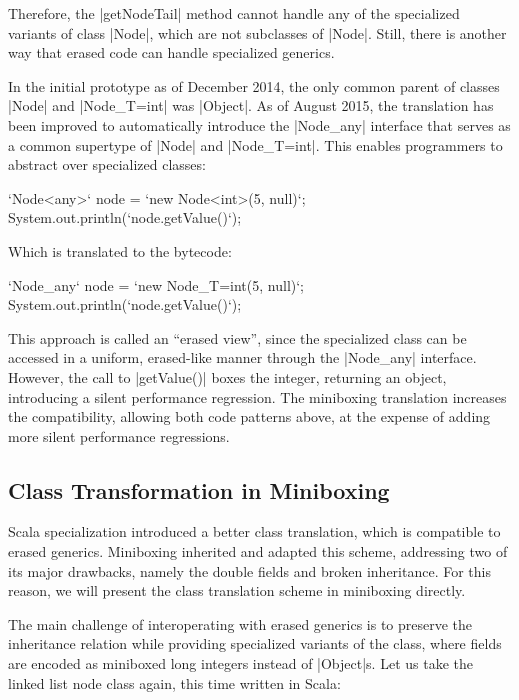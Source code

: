 Therefore, the |getNodeTail| method cannot handle any of the specialized variants of class |Node|, which are not subclasses of |Node|. Still, there is another way that erased code can handle specialized generics.

In the initial prototype as of December 2014, the only common parent of classes |Node| and |Node_{T=int}| was |Object|. As of August 2015, the translation has been improved to automatically introduce the |Node_any| interface that serves as a common supertype of |Node| and |Node_{T=int}|. This enables programmers to abstract over specialized classes:

\begin{lstlisting-nobreak}
`Node<any>` node = `new Node<int>(5, null)`;
System.out.println(`node.getValue()`);
\end{lstlisting-nobreak}

Which is translated to the bytecode:

\begin{lstlisting-nobreak}
`Node_any` node = `new Node_{T=int}(5, null)`;
System.out.println(`node.getValue()`);
\end{lstlisting-nobreak}

This approach is called an ``erased view'', since the specialized class can be accessed in a uniform, erased-like manner through the |Node_any| interface. However, the call to |getValue()| boxes the integer, returning an object, introducing a silent performance regression. The miniboxing translation increases the compatibility, allowing both code patterns above, at the expense of adding more silent performance regressions.

\subsection{Class Transformation in Miniboxing}

Scala specialization \cite{iuli-thesis, specialization-iuli} introduced a better class translation, which is compatible to erased generics. Miniboxing \cite{miniboxing} inherited and adapted this scheme, addressing two of its major drawbacks, namely the double fields and broken inheritance. For this reason, we will present the class translation scheme in miniboxing directly.

The main challenge of interoperating with erased generics is to preserve the inheritance relation while providing specialized variants of the class, where fields are encoded as miniboxed long integers instead of |Object|s. Let us take the linked list node class again, this time written in Scala:

